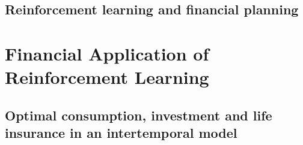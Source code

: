 \documentclass[letterpaper,10pt,english]{jupyterBook}
\begin{document}
\subsection{Reinforcement learning and financial planning}
\label{\detokenize{Reinforcement_learning:reinforcement-learning-and-financial-planning}}

\section{Financial Application of Reinforcement Learning}
\label{\detokenize{Financial_application:financial-application-of-reinforcement-learning}}\label{\detokenize{Financial_application::doc}}

\subsection{Optimal consumption, investment and life insurance in an intertemporal model}
\label{\detokenize{Financial_application:optimal-consumption-investment-and-life-insurance-in-an-intertemporal-model}}
\sphinxAtStartPar
\end{document}
